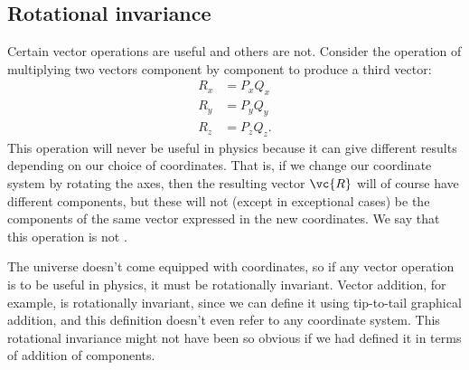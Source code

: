 \subsection{Rotational invariance}

Certain vector operations
are useful and others are not. Consider the operation of
multiplying two vectors component by component to produce a third vector:
\begin{align*}
        R_x    &=    P_x Q_x  \\
        R_y    &=    P_y Q_y  \\
        R_z    &=    P_z Q_z.
\end{align*}
This operation will never be useful in physics because it can give different
results depending on our choice of coordinates. That is, if we change our coordinate
system by rotating the axes, then the resulting vector
$\vc{R}$ will of course have different components, but these will not (except in exceptional cases)
be the components of the same vector expressed in the new coordinates. We say that this
operation is not .

The universe doesn't come equipped with coordinates, so if any vector operation is to be useful in
physics, it must be rotationally invariant. Vector addition, for example, is rotationally invariant, since we
can define it using tip-to-tail graphical addition, and this definition doesn't even refer to any coordinate
system. This rotational invariance might not have been so obvious
if we had defined it in terms of addition of components.
